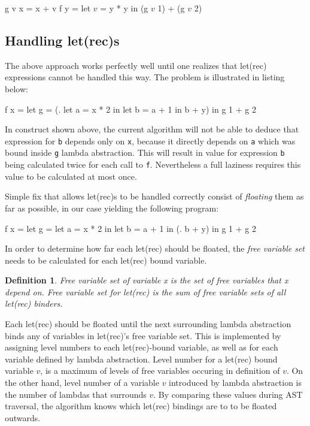 \documentclass[12pt,a4paper]{report}
\newtheorem{definition}{Definition}[chapter]
\begin{document}
\vspace*{0.2in}
\begin{code}[style=haskell,mathescape=true]
  g v x = x + v
  f y = let $v$ = y * y
        in (g $v$ 1) + (g $v$ 2)
\end{code}

\subsection{Handling let(rec)s}
The above approach works perfectly well until one realizes that let(rec)
expressions cannot be handled this way. The problem is illustrated in listing
below:

\vspace*{0.2in}
\begin{code}[style=haskell]
  f x = let g = (\y . let a = x * 2
                      in let b = a + 1
                      in b + y)
        in g 1 + g 2
\end{code}

In construct shown above, the current algorithm will not be able to deduce that
expression for \texttt{b} depends only on \texttt{x}, because it directly
depends on \texttt{a} which was bound inside \texttt{g} lambda abstraction.
This will result in value for expression \texttt{b} being calculated twice for
each call to \texttt{f}. Nevertheless a full laziness requires this value to be
calculated at most once.

Simple fix that allows let(rec)s to be handled correctly consist of
\textit{floating} them as far as possible, in our case yielding the following
program:

\vspace*{0.2in}
\begin{code}[style=haskell]
  f x = let g = let a = x * 2
                in let b = a + 1
                in (\y . b + y)
        in g 1 + g 2
\end{code}

In order to determine how far each let(rec) should be floated, the \textit{free
variable set} needs to be calculated for each let(rec) bound variable.

\begin{definition}
  Free variable set of variable x is the set of free variables
  that x depend on. Free variable set for let(rec) is the sum of free
  variable sets of all let(rec) binders.
\end{definition}

Each let(rec) should be floated until the next surrounding lambda abstraction
binds any of variables in let(rec)'s free variable set. This is implemented by
assigning level numbers to each let(rec)-bound variable, as well as for each
variable defined by lambda abstraction. Level number for a let(rec) bound
variable $v$, is a maximum of levels of free variables occuring in definition
of $v$. On the other hand, level number of a variable $v$ introduced by lambda
abstraction is the number of lambdas that surrounds $v$. By comparing these
values during AST traversal, the algorithm knows which let(rec) bindings are to
to be floated outwards.
\end{document}
